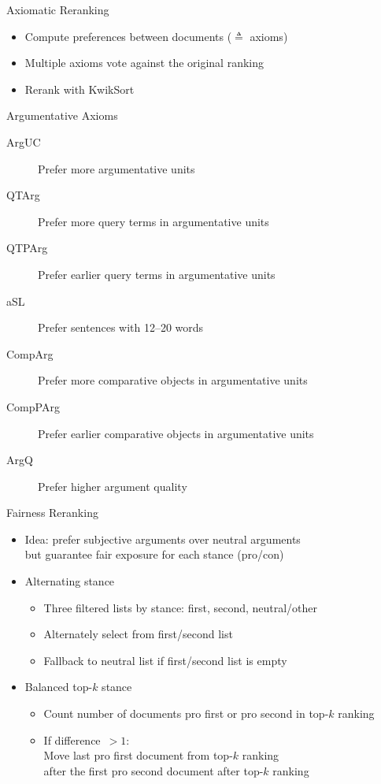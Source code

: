 \documentclass[english]{mlutalk}
\begin{document}
\begin{frame}{Axiomatic Reranking}
  \begin{itemize}
    \item Compute preferences between documents (\(\triangleq\) axioms)
    \item Multiple axioms vote against the original ranking
    \item Rerank with KwikSort~\cite{hagen:2016d}
  \end{itemize}
  \begin{block}{Argumentative Axioms}
    \begin{description}
      \item[ArgUC] Prefer more argumentative units~\cite{bondarenko:2018}
      \item[QTArg] Prefer more query terms in argumentative units~\cite{bondarenko:2018}
      \item[QTPArg] Prefer earlier query terms in argumentative units~\cite{bondarenko:2018}
      \item[aSL] Prefer sentences with 12--20 words~\cite{bondarenkoaxiomatic}
      \item[CompArg] Prefer more comparative objects in argumentative units
      \item[CompPArg] Prefer earlier comparative objects in argumentative units
      \item[ArgQ] Prefer higher argument quality
    \end{description}
  \end{block}
\end{frame}

\begin{frame}{Fairness Reranking}
  \begin{itemize}
    \item Idea: prefer subjective arguments over neutral arguments \\
    but guarantee fair exposure for each stance (pro/con)
    \item Alternating stance
    \begin{itemize}
      \item Three filtered lists by stance: first, second, neutral/other
      \item Alternately select from first/second list
      \item Fallback to neutral list if first/second list is empty
    \end{itemize}
    \item Balanced top-\(k\) stance
    \begin{itemize}
      \item Count number of documents pro first or pro second in top-\(k\) ranking
      \item If difference~\(>1\): \\
      Move last pro first document from top-\(k\) ranking \\
      after the first pro second document after top-\(k\) ranking
    \end{itemize}
  \end{itemize}
\end{frame}
\end{document}
